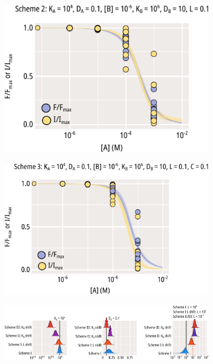\begin{figure}[h]
	\centering
	\begin{subfigure}[t]{0.45\textwidth}
		\caption{}\label{ch4fig:scheme_2_kb_shift}
		\centering
		\includegraphics[width=\textwidth]{mwc_scheme_2_kb_shift.pdf}
	\end{subfigure}
	\hfill
	\begin{subfigure}[t]{0.45\textwidth}
		\caption{}\label{ch4fig:scheme_3_kb_shift}
		\centering
		\includegraphics[width=\textwidth]{mwc_scheme_3_kb_shift.pdf}
	\end{subfigure}
	\vfill
	\begin{subfigure}[t]{0.9\textwidth}
		\caption{}\label{ch4fig:mwc_params_3}
		\centering
		\includegraphics[width=\textwidth]{mwc_scheme_param_fits_3.pdf}

\end{subfigure}
\end{figure}
